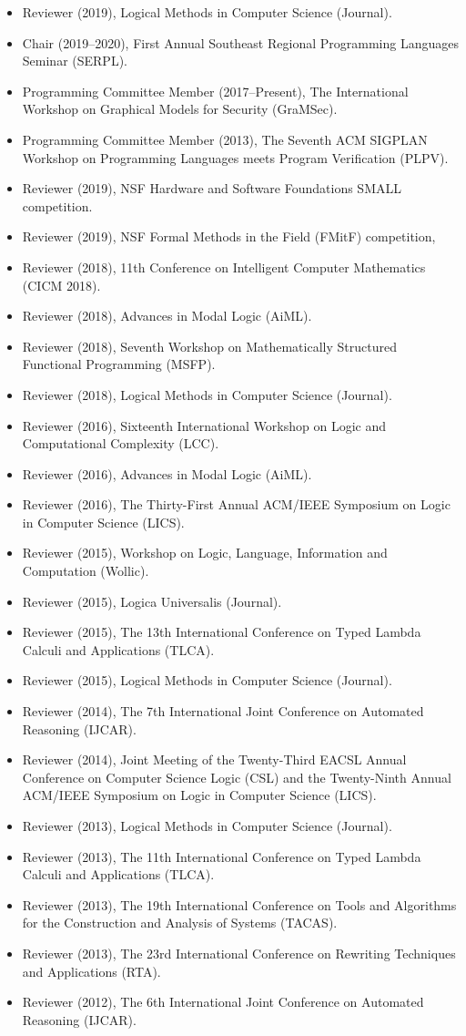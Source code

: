 \documentclass[11pt]{article}
\begin{document}
\begin{itemize}\itemsep-2px
\item Reviewer (2019), Logical Methods in Computer Science (Journal).
\item Chair (2019--2020), First Annual Southeast Regional Programming Languages Seminar (SERPL).
\item Programming Committee Member (2017--Present), The International Workshop on Graphical Models for Security (GraMSec). 
\item Programming Committee Member (2013), The Seventh ACM SIGPLAN Workshop on Programming Languages meets Program Verification (PLPV).
\item Reviewer (2019), NSF Hardware and Software Foundations SMALL competition.
\item Reviewer (2019), NSF Formal Methods in the Field (FMitF) competition,
\item Reviewer (2018), 11th Conference on Intelligent Computer Mathematics (CICM 2018).
\item Reviewer (2018), Advances in Modal Logic (AiML).
\item Reviewer (2018), Seventh Workshop on Mathematically Structured Functional Programming (MSFP).
\item Reviewer (2018), Logical Methods in Computer Science (Journal).
\item Reviewer (2016), Sixteenth International Workshop on Logic and Computational Complexity (LCC).
\item Reviewer (2016), Advances in Modal Logic (AiML).
\item Reviewer (2016), The Thirty-First Annual ACM/IEEE Symposium on Logic in Computer Science (LICS).
\item Reviewer (2015), Workshop on Logic, Language, Information and Computation (Wollic).          
\item Reviewer (2015), Logica Universalis (Journal).    
\item Reviewer (2015), The 13th International Conference on Typed Lambda Calculi and Applications (TLCA).    
\item Reviewer (2015), Logical Methods in Computer Science (Journal).    
\item Reviewer (2014), The 7th International Joint Conference on Automated Reasoning (IJCAR).
\item Reviewer (2014), Joint Meeting of the Twenty-Third EACSL Annual Conference on Computer Science Logic (CSL) and the Twenty-Ninth Annual ACM/IEEE Symposium on Logic in Computer Science (LICS).
\item Reviewer (2013), Logical Methods in Computer Science (Journal).    
\item Reviewer (2013), The 11th International Conference on Typed Lambda Calculi and Applications (TLCA).
\item Reviewer (2013), The 19th International Conference on Tools and Algorithms for the Construction and Analysis of Systems (TACAS).  
\item Reviewer (2013), The 23rd International Conference on Rewriting Techniques and Applications (RTA).
\item Reviewer (2012), The 6th International Joint Conference on Automated Reasoning (IJCAR).
\end{itemize}
\end{document}
